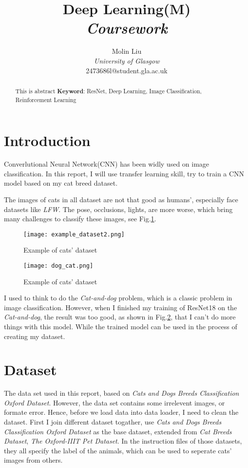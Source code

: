 \documentclass[12pt]{article}
\title{
    Deep Learning(M)\\
    \textit{Coursework}
}
\author{
    Molin Liu\\
\textit{University of Glasgow}\\
2473686l@student.gla.ac.uk
}
\begin{document}
\maketitle

\begin{abstract}
This is abstract
\textbf{Keyword}: ResNet, Deep Learning, Image Classification, Reinforcement Learning
\end{abstract}
\section{Introduction}
Converlutional Neural Network(CNN) has been widly
used on image classification. 
In this report, I will use transfer learning skill,
try to train a CNN model based on my cat breed dataset.

The images of cats in all dataset are not that good as humans', 
especially face datasets like \textit{LFW}. 
The pose, occlusions, lights, are more worse, 
which bring many challenges to classify these images, 
see Fig.\ref{fig:example}.

\begin{figure}[h]
    \centering
    \texttt{[image: example\_dataset2.png]}
    \caption{Example of cats' dataset}
    \label{fig:example}
\end{figure}

\begin{figure}[h]
    \centering
    \texttt{[image: dog\_cat.png]}
    \caption{Example of cats' dataset}
    \label{fig:dog}
\end{figure}

I used to think to do the \textit{Cat-and-dog} problem, 
which is a classic problem in image classification. 
However, when I finished my training of ResNet18 on the \textit{Cat-and-dog},
the result was too good, as shown in Fig.\ref{fig:dog}, 
that I can't do more things with this model.
While the trained model can be used in the process of creating my dataset.



\section{Dataset}
The data set used in this report, based on 
\textit{Cats and Dogs Breeds Classification Oxford Dataset}.
However, the data set contains some irrelevent images,
or formate error. Hence, before we load data into data loader,
 I need to clean the dataset.
First I join different dataset togather, use \textit{Cats and Dogs Breeds Classification Oxford Dataset}
as the base dataset, extended from
\textit{Cat Breeds Dataset},
\textit{The Oxford-IIIT Pet Dataset}.
In the instruction files of those datasets, they all specify the
 label of the animals, which can be used to seperate cats' images
 from others.
\end{document}
